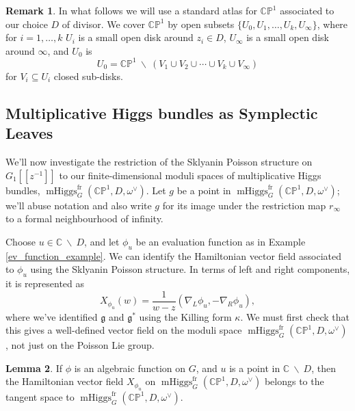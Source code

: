 \documentclass[11pt, oneside, reqno]{amsart}
\theoremstyle{definition} \newtheorem{definition}{Definition}[section]
\newtheorem{lemma}[definition]{Lemma}
\theoremstyle{definition} \newtheorem{remark}[definition]{Remark}
\theoremstyle{definition} \newtheorem{remarks}[definition]{Remarks}
\theoremstyle{definition} \newtheorem{question}[definition]{Question}
\theoremstyle{definition} \newtheorem*{note}{Note}
\theoremstyle{definition} \newtheorem{example}[definition]{Example}
\theoremstyle{definition} \newtheorem{examples}[definition]{Examples}
\renewcommand{\gg}{\mathfrak{g}}
\newcommand{\bb}[1]{\mathbb{#1}}
\newcommand{\bs}{\ \backslash \ }
\newcommand{\CC}{\mathbb{C}}
\newcommand{\sub}{\subseteq}
\DeclareMathOperator{\mhiggs}{mHiggs}
\newcommand{\fr}{\mathrm{fr}}
\begin{document}
\begin{remark} \label{atlas_remark}
In what follows we will use a standard atlas for $\bb{CP}^1$ associated to our choice $D$ of divisor.  We cover $\bb{CP}^1$ by open subsets $\{U_0, U_1, \ldots, U_k, U_\infty\}$, where for $i=1, \ldots, k$ $U_i$ is a small open disk around $z_i \in D$, $U_\infty$ is a small open disk around $\infty$, and $U_0$ is 
\[U_0 = \bb{CP}^1 \bs (V_1 \cup V_2 \cup \cdots \cup V_k \cup V_\infty)\]
for $V_i \sub U_i$ closed sub-disks.
\end{remark}

\subsection{Multiplicative Higgs bundles as Symplectic Leaves} \label{symplectic_leaf_section}
We'll now investigate the restriction of the Sklyanin Poisson structure on $G_1[[z^{-1}]]$ to our finite-dimensional moduli spaces of multiplicative Higgs bundles, $\mhiggs^\fr_G(\bb{CP}^1, D, \omega^\vee)$.  Let $g$ be a point in $\mhiggs^\fr_G(\bb{CP}^1, D, \omega^\vee)$; we'll abuse notation and also write $g$ for its image under the restriction map $r_\infty$ to a formal neighbourhood of infinity.

Choose $u \in \CC \bs D$, and let $\phi_u$ be an evaluation function as in Example \ref{ev_function_example}.  We can identify the Hamiltonian vector field associated to $\phi_u$ using the Sklyanin Poisson structure.  In terms of left and right components, it is represented as
\begin{equation}
\label{eq:Xphiz}
X_{\phi_u}(w) =  \frac{1}{w - z} (\nabla_{L} \phi_u,  - \nabla_{R} \phi_u),
\end{equation}
where we've identified $\gg$ and $\gg^*$ using the Killing form $\kappa$.  We must first check that this gives a well-defined vector field on the moduli space $\mhiggs^\fr_G(\bb{CP}^1, D, \omega^\vee)$, not just on the Poisson Lie group.

\begin{lemma}\label{phitoX}
  If $\phi$ is an algebraic function on $G$, and $u$ is a point in $\CC \bs D$, then the Hamiltonian vector field $X_{\phi_u}$ on $\mhiggs^\fr_G(\bb{CP}^1, D, \omega^\vee)$ belongs to the tangent space to $\mhiggs^\fr_G(\bb{CP}^1, D, \omega^\vee)$.  
\end{lemma}
\end{document}
